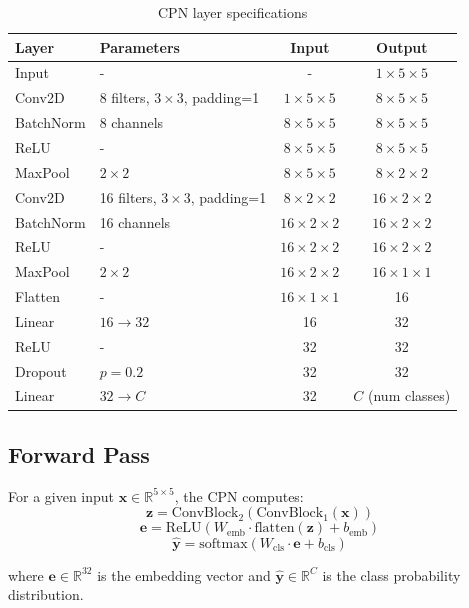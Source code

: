 \begin{table}[htbp]
\centering
\caption{CPN layer specifications}
\label{tab:cpn_layers}
\begin{tabular}{|l|l|c|c|}
\hline
\textbf{Layer} & \textbf{Parameters} & \textbf{Input} & \textbf{Output} \\
\hline
Input & - & - & \(1 \times 5 \times 5\) \\
Conv2D & 8 filters, \(3 \times 3\), padding=1 & \(1 \times 5 \times 5\) & \(8 \times 5 \times 5\) \\
BatchNorm & 8 channels & \(8 \times 5 \times 5\) & \(8 \times 5 \times 5\) \\
ReLU & - & \(8 \times 5 \times 5\) & \(8 \times 5 \times 5\) \\
MaxPool & \(2 \times 2\) & \(8 \times 5 \times 5\) & \(8 \times 2 \times 2\) \\
Conv2D & 16 filters, \(3 \times 3\), padding=1 & \(8 \times 2 \times 2\) & \(16 \times 2 \times 2\) \\
BatchNorm & 16 channels & \(16 \times 2 \times 2\) & \(16 \times 2 \times 2\) \\
ReLU & - & \(16 \times 2 \times 2\) & \(16 \times 2 \times 2\) \\
MaxPool & \(2 \times 2\) & \(16 \times 2 \times 2\) & \(16 \times 1 \times 1\) \\
Flatten & - & \(16 \times 1 \times 1\) & 16 \\
Linear & \(16 \to 32\) & 16 & 32 \\
ReLU & - & 32 & 32 \\
Dropout & \(p = 0.2\) & 32 & 32 \\
Linear & \(32 \to C\) & 32 & \(C\) (num classes) \\
\hline
\end{tabular}
\end{table}

\subsection{Forward Pass}

For a given input \(\mathbf{x} \in \mathbb{R}^{5 \times 5}\), the CPN computes:
\[
\mathbf{z} = \text{ConvBlock}_2(\text{ConvBlock}_1(\mathbf{x}))
\]
\[
\mathbf{e} = \text{ReLU}(W_{\text{emb}} \cdot \text{flatten}(\mathbf{z}) + b_{\text{emb}})
\]
\[
\hat{\mathbf{y}} = \text{softmax}(W_{\text{cls}} \cdot \mathbf{e} + b_{\text{cls}})
\]

where \(\mathbf{e} \in \mathbb{R}^{32}\) is the embedding vector and \(\hat{\mathbf{y}} \in \mathbb{R}^C\) is the class probability distribution.

